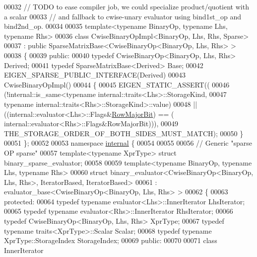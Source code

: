 \begin{DoxyCode}
00032 \textcolor{comment}{// TODO to ease compiler job, we could specialize product/quotient with a scalar}
00033 \textcolor{comment}{//      and fallback to cwise-unary evaluator using bind1st\_op and bind2nd\_op.}
00034 
00035 \textcolor{keyword}{template}<\textcolor{keyword}{typename} BinaryOp, \textcolor{keyword}{typename} Lhs, \textcolor{keyword}{typename} Rhs>
00036 \textcolor{keyword}{class }CwiseBinaryOpImpl<BinaryOp, Lhs, Rhs, Sparse>
00037   : \textcolor{keyword}{public} SparseMatrixBase<CwiseBinaryOp<BinaryOp, Lhs, Rhs> >
00038 \{
00039   \textcolor{keyword}{public}:
00040     \textcolor{keyword}{typedef} CwiseBinaryOp<BinaryOp, Lhs, Rhs> Derived;
00041     \textcolor{keyword}{typedef} SparseMatrixBase<Derived> Base;
00042     EIGEN\_SPARSE\_PUBLIC\_INTERFACE(Derived)
00043     CwiseBinaryOpImpl()
00044     \{
00045       EIGEN\_STATIC\_ASSERT((
00046                 (!internal::is\_same<\textcolor{keyword}{typename} internal::traits<Lhs>::StorageKind,
00047                                     \textcolor{keyword}{typename} internal::traits<Rhs>::StorageKind>::value)
00048             ||  ((internal::evaluator<Lhs>::Flags&\hyperlink{group__flags_gae4f56c2a60bbe4bd2e44c5b19cbe8762}{RowMajorBit}) == (
      internal::evaluator<Rhs>::Flags&RowMajorBit))),
00049             THE\_STORAGE\_ORDER\_OF\_BOTH\_SIDES\_MUST\_MATCH);
00050     \}
00051 \};
00052 
00053 \textcolor{keyword}{namespace }\hyperlink{namespaceinternal}{internal} \{
00054 
00055   
00056 \textcolor{comment}{// Generic "sparse OP sparse"}
00057 \textcolor{keyword}{template}<\textcolor{keyword}{typename} XprType> \textcolor{keyword}{struct }binary\_sparse\_evaluator;
00058 
00059 \textcolor{keyword}{template}<\textcolor{keyword}{typename} BinaryOp, \textcolor{keyword}{typename} Lhs, \textcolor{keyword}{typename} Rhs>
00060 \textcolor{keyword}{struct }binary\_evaluator<CwiseBinaryOp<BinaryOp, Lhs, Rhs>, IteratorBased, IteratorBased>
00061   : evaluator\_base<CwiseBinaryOp<BinaryOp, Lhs, Rhs> >
00062 \{
00063 \textcolor{keyword}{protected}:
00064   \textcolor{keyword}{typedef} \textcolor{keyword}{typename} evaluator<Lhs>::InnerIterator  LhsIterator;
00065   \textcolor{keyword}{typedef} \textcolor{keyword}{typename} evaluator<Rhs>::InnerIterator  RhsIterator;
00066   \textcolor{keyword}{typedef} CwiseBinaryOp<BinaryOp, Lhs, Rhs> XprType;
00067   \textcolor{keyword}{typedef} \textcolor{keyword}{typename} traits<XprType>::Scalar Scalar;
00068   \textcolor{keyword}{typedef} \textcolor{keyword}{typename} XprType::StorageIndex StorageIndex;
00069 \textcolor{keyword}{public}:
00070 
00071   \textcolor{keyword}{class }InnerIterator

\end{DoxyCode}
